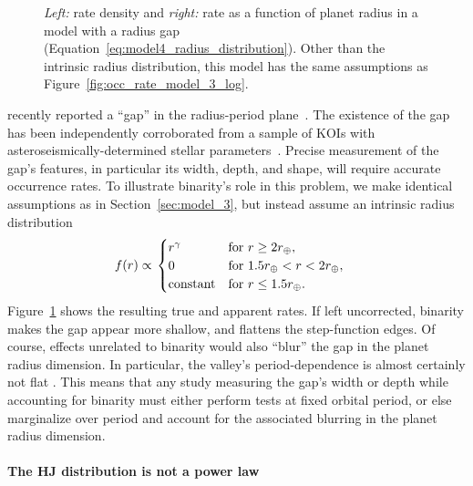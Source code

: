 \documentclass[12pt,modern]{aastex61}
\begin{document}
\begin{figure}[!t]
    \centering
    \caption{
        {\it Left:} rate density and {\it right:} rate as a function
        of planet radius in a model with a radius gap
        (Equation~\ref{eq:model4_radius_distribution}).  Other than
        the intrinsic radius distribution, this model has the same
        assumptions as Figure~\protect\ref{fig:occ_rate_model_3_log}.
    }
    \label{fig:model_4}
\end{figure}

\citet{fulton_california-_2017} recently reported a ``gap'' in the
radius-period
plane~\citep{petigura_california-kepler_2017,johnson_california-kepler_2017}.
The existence of the gap has been independently corroborated from a
sample of KOIs with asteroseismically-determined stellar
parameters~\citep{van_eylen_asteroseismic_2017}.  Precise measurement
of the gap's features, in particular its width, depth, and shape, will
require accurate occurrence rates.  To illustrate binarity's role in
this problem, we make identical assumptions as in
Section~\ref{sec:model_3}, but instead assume an intrinsic radius
distribution
\begin{align}
    f(r)
    &\propto
    \left.
    \begin{cases}
        r^\gamma & \text{for } r\geq 2r_\oplus, \\
        0 & \text{for } 1.5r_\oplus < r < 2r_\oplus, \\
        {\rm constant} & \text{for } r\leq1.5r_\oplus.
    \end{cases}
    \right.
    \label{eq:model4_radius_distribution}
\end{align}
Figure~\ref{fig:model_4} shows the resulting true and apparent rates.
If left uncorrected, binarity makes the gap appear more shallow, and
flattens the step-function edges.  Of course, effects unrelated to
binarity would also ``blur'' the gap in the planet radius dimension.
In particular, the valley's period-dependence is almost certainly not
flat \citep{van_eylen_asteroseismic_2017,owen_evaporation_2017}.  This
means that any study measuring the gap's width or depth while
accounting for binarity must either perform tests at fixed orbital
period, or else marginalize over period and account for the associated
blurring in the planet radius dimension.


\paragraph{The HJ distribution is not a power law}
\end{document}

